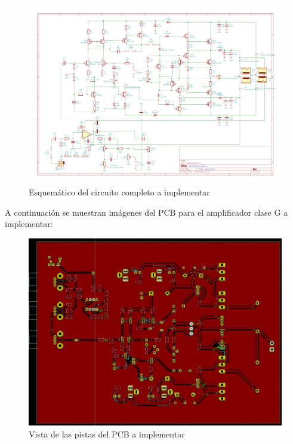 \begin{figure}[H]
        \centering
        \includegraphics[scale=0.36]{./Amplificador_completo.png}
        \caption{Esquemático del circuito completo a implementar}
        \label{fig::Amplificador_completo}
\end{figure}

A continuación se muestran imágenes del PCB para el amplificador clase G a implementar:

\begin{figure}[H]
        \centering
        \includegraphics[scale=0.3]{./PCB1.jpeg}
        \caption{Vista de las pistas del PCB a implementar}
        \label{fig::PCB1}
\end{figure}

